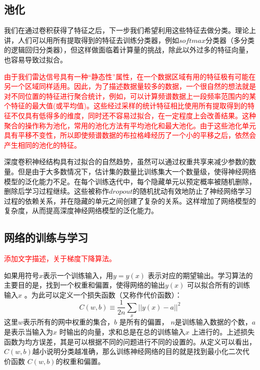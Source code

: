 \subsection{池化}
我们在通过卷积获得了特征之后，下一步我们希望利用这些特征去做分类。理论上讲，人们可以用所有提取得到的特征去训练分类器，例如$softmax$分类器（多分类的逻辑回归分类器），但这样做面临着计算量的挑战，除此以外过多的特征向量，也容易导致过拟合。

\textcolor{red}{由于我们雷达信号具有一种“静态性”属性，在一个数据区域有用的特征极有可能在另一个区域同样适用。因此，为了描述数据量较多的数据，一个很自然的想法就是对不同位置的特征进行聚合统计，例如，可以计算频谱数据上一段频率范围内的某个特征的最大值(或平均值)。这些经过采样的统计特征相比使用所有提取得到的特征不仅具有低得多的维度，同时还不容易过拟合，在一定程度上会改善结果。这种聚合的操作称为池化，常用的池化方法有平均池化和最大池化。由于这些池化单元具有平移不变性，所以即使频谱数据的布拉格峰经历了一个小的平移之后，依然会产生相同的池化的特征。
}

深度卷积神经结构具有过拟合的自然趋势，虽然可以通过权重共享来减少参数的数量。但是由于大多数情况下，估计集的数量比训练集大一个数量级，使得神经网络模型的泛化能力不足。在每个训练迭代中，每个隐藏单元以预定概率被随机删除，删除后学习过程继续。这些被称作$dropout$的随机扰动有效地防止了神经网络学习过程的依赖关系，并在隐藏的单元之间创建了复杂的关系。这样增加了网络模型的复杂度，从而提高深度神经网络模型的泛化能力。
\subsection{网络的训练与学习}
\textcolor{red}{添加文字描述，关于梯度下降算法。}

如果用符号$x $表示一个训练输入，用$y=y(x) $ 表示对应的期望输出。学习算法的主要目的是，找到一个权重和偏置，使得网络的输出$y(x) $ 可以拟合所有的训练输入$x$ 。为此可以定义一个损失函数（又称作代价函数）：
\begin{equation}
  C(w,b)\equiv \frac{1}{2n}\sum_x||y(x)-a||^2 
\end{equation}
这里$w$表示所有的网中权重的集合，$b$ 是所有的偏置， $n$是训练输入数据的个数，$a$ 是表示当输入为$x$ 时输出的向量，求和总是在总的训练输入$x$ 上进行的。上述损失函数为均方误差，其是可以根据不同的问题进行不同的设置的。从定义可以看出， $C(w,b) $越小说明分类越准确，那么训练神经网络的目的就是找到最小化二次代价函数 $C(w,b) $的权重和偏置。

